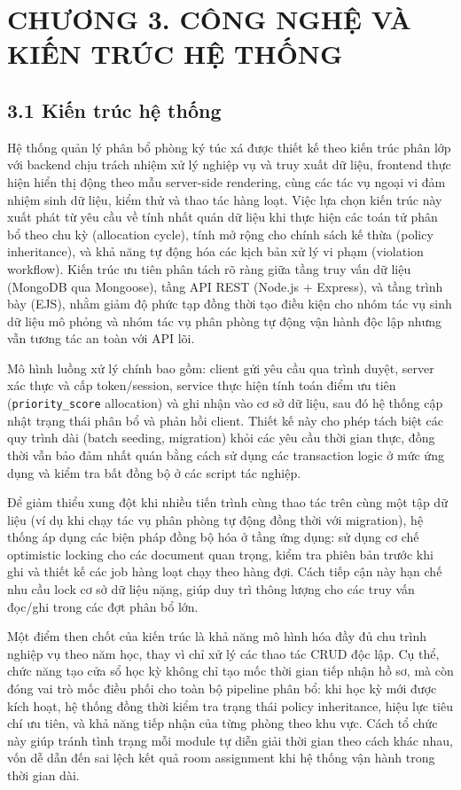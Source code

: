 \chapter*{CHƯƠNG 3. CÔNG NGHỆ VÀ KIẾN TRÚC HỆ THỐNG}

\section*{3.1 Kiến trúc hệ thống}
Hệ thống quản lý phân bổ phòng ký túc xá được thiết kế theo kiến trúc phân lớp với backend chịu trách nhiệm xử lý nghiệp vụ và truy xuất dữ liệu, frontend thực hiện hiển thị động theo mẫu server-side rendering, cùng các tác vụ ngoại vi đảm nhiệm sinh dữ liệu, kiểm thử và thao tác hàng loạt. Việc lựa chọn kiến trúc này xuất phát từ yêu cầu về tính nhất quán dữ liệu khi thực hiện các toán tử phân bổ theo chu kỳ (allocation cycle), tính mở rộng cho chính sách kế thừa (policy inheritance), và khả năng tự động hóa các kịch bản xử lý vi phạm (violation workflow). Kiến trúc ưu tiên phân tách rõ ràng giữa tầng truy vấn dữ liệu (MongoDB qua Mongoose), tầng API REST (Node.js + Express), và tầng trình bày (EJS), nhằm giảm độ phức tạp đồng thời tạo điều kiện cho nhóm tác vụ sinh dữ liệu mô phỏng và nhóm tác vụ phân phòng tự động vận hành độc lập nhưng vẫn tương tác an toàn với API lõi.

Mô hình luồng xử lý chính bao gồm: client gửi yêu cầu qua trình duyệt, server xác thực và cấp token/session, service thực hiện tính toán điểm ưu tiên (\texttt{priority\_score} allocation) và ghi nhận vào cơ sở dữ liệu, sau đó hệ thống cập nhật trạng thái phân bổ và phản hồi client. Thiết kế này cho phép tách biệt các quy trình dài (batch seeding, migration) khỏi các yêu cầu thời gian thực, đồng thời vẫn bảo đảm nhất quán bằng cách sử dụng các transaction logic ở mức ứng dụng và kiểm tra bất đồng bộ ở các script tác nghiệp.

Để giảm thiểu xung đột khi nhiều tiến trình cùng thao tác trên cùng một tập dữ liệu (ví dụ khi chạy tác vụ phân phòng tự động đồng thời với migration), hệ thống áp dụng các biện pháp đồng bộ hóa ở tầng ứng dụng: sử dụng cơ chế optimistic locking cho các document quan trọng, kiểm tra phiên bản trước khi ghi và thiết kế các job hàng loạt chạy theo hàng đợi. Cách tiếp cận này hạn chế nhu cầu lock cơ sở dữ liệu nặng, giúp duy trì thông lượng cho các truy vấn đọc/ghi trong các đợt phân bổ lớn.

Một điểm then chốt của kiến trúc là khả năng mô hình hóa đầy đủ chu trình nghiệp vụ theo năm học, thay vì chỉ xử lý các thao tác CRUD độc lập. Cụ thể, chức năng tạo cửa sổ học kỳ không chỉ tạo mốc thời gian tiếp nhận hồ sơ, mà còn đóng vai trò mốc điều phối cho toàn bộ pipeline phân bổ: khi học kỳ mới được kích hoạt, hệ thống đồng thời kiểm tra trạng thái policy inheritance, hiệu lực tiêu chí ưu tiên, và khả năng tiếp nhận của từng phòng theo khu vực. Cách tổ chức này giúp tránh tình trạng mỗi module tự diễn giải thời gian theo cách khác nhau, vốn dễ dẫn đến sai lệch kết quả room assignment khi hệ thống vận hành trong thời gian dài.

